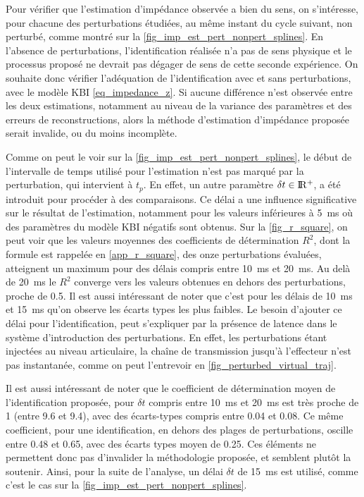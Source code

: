 \documentclass[12pt, a4paper]{article} %
\numberwithin{equation}{section}
\begin{document}
Pour vérifier que l'estimation d'impédance observée a bien du sens, on s'intéresse, pour chacune des perturbations étudiées, au même instant du cycle suivant, non perturbé, comme montré sur la \cref{fig_imp_est_pert_nonpert_splines}. En l'absence de perturbations, l'identification réalisée n'a pas de sens physique et le processus proposé ne devrait pas dégager de sens de cette seconde expérience. On souhaite donc vérifier l'adéquation de l'identification avec et sans perturbations, avec le modèle KBI \cref{eq_impedance_z}. Si aucune différence n'est observée entre les deux estimations, notamment au niveau de la variance des paramètres et des erreurs de reconstructions, alors la méthode d'estimation d'impédance proposée serait invalide, ou du moins incomplète.
%

%
\newlineBlank
% 
Comme on peut le voir sur la \cref{fig_imp_est_pert_nonpert_splines}, le début de l'intervalle de temps utilisé pour l'estimation n'est pas marqué par la perturbation, qui intervient à $ t_{p} $. En effet, un autre paramètre $ \delta t \in \rm I\!R^+ $, a été introduit pour procéder à des comparaisons. Ce délai a une influence significative sur le résultat de l'estimation, notamment pour les valeurs inférieures à \SI{5}{\milli\second} où des paramètres du modèle KBI négatifs sont obtenus. Sur la \cref{fig_r_square}, on peut voir que les valeurs moyennes des coefficients de détermination $ R^2 $, dont la formule est rappelée en \cref{app_r_square}, des onze perturbations évaluées, atteignent un maximum pour des délais compris entre \SI{10}{\milli\second} et \SI{20}{\milli\second}. Au delà de \SI{20}{\milli\second} le $ R^2 $ converge vers les valeurs obtenues en dehors des perturbations, proche de 0.5. Il est aussi intéressant de noter que c'est pour les délais de \SI{10}{\milli\second} et \SI{15}{\milli\second} qu'on observe les écarts types les plus faibles. Le besoin d'ajouter ce délai pour l'identification, peut s'expliquer par la présence de latence dans le système d'introduction des perturbations. En effet, les perturbations étant injectées au niveau articulaire, la chaîne de transmission jusqu'à l'effecteur n'est pas instantanée, comme on peut l'entrevoir en \cref{fig_perturbed_virtual_traj}.
%

%
\newlineBlank
% 
Il est aussi intéressant de noter que le coefficient de détermination moyen de l'identification proposée, pour $ \delta t $ compris entre \SI{10}{\milli\second} et \SI{20}{\milli\second} est très proche de 1 (entre 9.6 et 9.4), avec des écarts-types compris entre 0.04 et 0.08. Ce même coefficient, pour une identification, en dehors des plages de perturbations, oscille entre 0.48 et 0.65, avec des écarts types moyen de 0.25. Ces éléments ne permettent donc pas d'invalider la méthodologie proposée, et semblent plutôt la soutenir. Ainsi, pour la suite de l'analyse, un délai $ \delta t $ de \SI{15}{\milli\second} est utilisé, comme c'est le cas sur la \cref{fig_imp_est_pert_nonpert_splines}.
\end{document}
